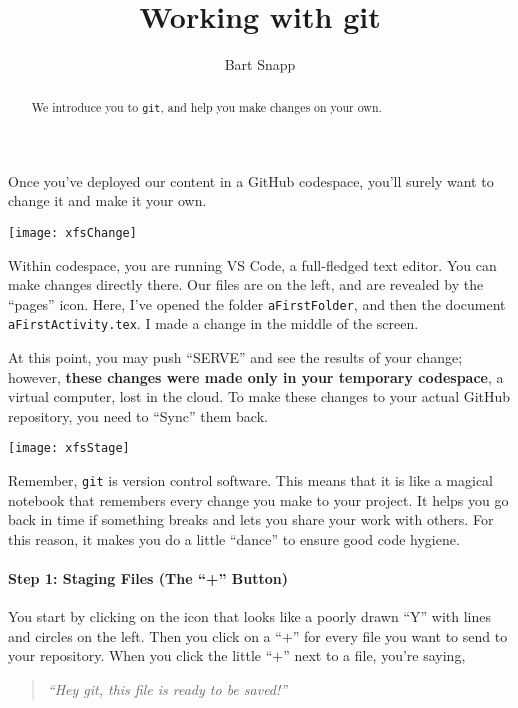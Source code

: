 \documentclass{ximera}
\author{Bart Snapp}
\title{Working with git}
\begin{document}
\pdfOnly{\onecolumn}
\begin{abstract}
    We introduce you to \texttt{git}, and help you make changes on your own.
\end{abstract}
\maketitle
Once you've deployed our content in a GitHub codespace, you'll surely want to
change it and  make it your own.
\begin{image}
    \texttt{[image: xfsChange]}
\end{image}
    Within codespace, you are running VS Code, a
    full-fledged text editor. You can make changes directly there. Our files
    are on
    the left, and are revealed by the ``pages'' icon.
    Here, I've opened the folder \verb!aFirstFolder!, and then the document
    \verb!aFirstActivity.tex!. I made a change in the middle of the screen.

    At this point, you may push ``SERVE'' and see the results of your change;
    however, \textbf{these changes were made only in your temporary codespace},
    a
    virtual
    computer, lost in the cloud. To make these changes to your actual GitHub
    repository, you need to ``Sync'' them back.
\pdfOnly{\end{multicols}}

\newpage

\begin{image}
    \texttt{[image: xfsStage]}
\end{image}

    Remember, \verb!git! is version control software. This means that it is like a magical notebook that remembers every change you
    make to your
    project. It helps you go back in time if something breaks and lets you
    share
    your work with others. For this reason, it makes you do a little ``dance''
    to ensure good code hygiene.

    \paragraph{Step 1: Staging Files (The ``+'' Button)}

    You start by clicking on the icon that looks like a poorly drawn ``Y'' with
    lines and circles on the left. Then you click on a ``$\boldsymbol{+}$'' for every file you
    want
    to send to your repository.  When you click the little ``$\boldsymbol{+}$'' next
    to a
    file, you're saying,
    \begin{quote}
        \emph{``Hey git, this file is ready to be saved!''}
    \end{quote}
\end{document}
